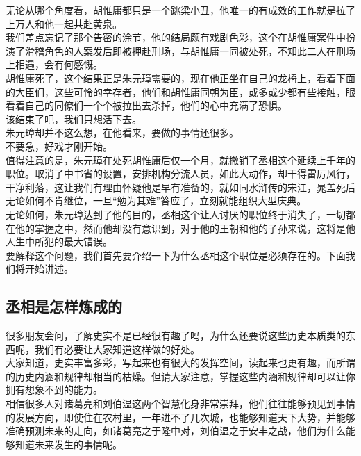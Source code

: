 \begin{multicols}{\theparacolNo}
无论从哪个角度看，胡惟庸都只是一个跳梁小丑，他唯一的有成效的工作就是拉了上万人和他一起共赴黄泉。\\

我们差点忘记了那个告密的涂节，他的结局颇有戏剧色彩，这个在胡惟庸案件中扮演了滑稽角色的人案发后即被押赴刑场，与胡惟庸一同被处死，不知此二人在刑场上相遇，会有何感慨。\\

胡惟庸死了，这个结果正是朱元璋需要的，现在他正坐在自己的龙椅上，看着下面的大臣们，这些可怜的幸存者，他们和胡惟庸同朝为臣，或多或少都有些接触，眼看着自己的同僚们一个个被拉出去杀掉，他们的心中充满了恐惧。\\

该结束了吧，我们只想活下去。\\

朱元璋却并不这么想，在他看来，要做的事情还很多。\\

不要急，好戏才刚开始。\\

值得注意的是，朱元璋在处死胡惟庸后仅一个月，就撤销了丞相这个延续上千年的职位。取消了中书省的设置，安排机构分流人员，如此大动作，却干得雷厉风行，干净利落，这让我们有理由怀疑他是早有准备的，就如同水浒传的宋江，晁盖死后无论如何不肯继位，一旦“勉为其难”答应了，立刻就能组织大型庆典。\\

无论如何，朱元璋达到了他的目的，丞相这个让人讨厌的职位终于消失了，一切都在他的掌握之中，然而他却没有意识到，对于他的王朝和他的子孙来说，这将是他人生中所犯的最大错误。\\

要解释这个问题，我们首先要介绍一下为什么丞相这个职位是必须存在的。下面我们将开始讲述。\\

\subsection{丞相是怎样炼成的}
很多朋友会问，了解史实不是已经很有趣了吗，为什么还要说这些历史本质类的东西呢，我们有必要让大家知道这样做的好处。\\

大家知道，史实丰富多彩，写起来也有很大的发挥空间，读起来也更有趣，而所谓的历史内涵和规律却相当的枯燥。但请大家注意，掌握这些内涵和规律却可以让你拥有想象不到的能力。\\

相信很多人对诸葛亮和刘伯温这两个智慧化身非常崇拜，他们往往能够预见到事情的发展方向，即使住在农村里，一年进不了几次城，也能够知道天下大势，并能够准确预测未来的走向，如诸葛亮之于隆中对，刘伯温之于安丰之战，他们为什么能够知道未来发生的事情呢。\\


\end{multicols}
